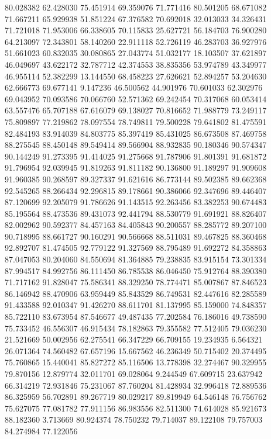 80.028382
62.428030
75.451914
69.359076
71.771416
80.501205
68.671082
71.667211
65.929938
51.851224
67.376582
70.692018
32.013033
34.326431
71.721018
71.953006
66.338605
70.115833
25.627721
56.184703
76.900280
64.213097
72.343801
58.140260
22.911118
52.726119
46.283703
36.927976
51.661023
60.832035
30.080865
27.043774
51.032177
18.103507
37.621897
46.049697
43.622172
32.787712
42.374553
38.835356
53.974789
43.349977
46.955114
52.382299
13.144550
68.458223
27.626621
52.894257
53.204630
62.666773
69.677141
9.147236
46.500562
44.901976
70.601033
62.302976
69.043952
70.093586
70.066760
52.571362
69.242454
70.317068
60.053414
63.557476
65.707188
67.616079
69.138027
70.816652
71.988779
73.249117
75.809897
77.219862
78.097554
78.749811
79.500228
79.641802
81.475591
82.484193
83.914039
84.803775
85.397419
85.431025
86.673508
87.469758
88.275545
88.450148
89.549414
89.566904
88.932835
90.180346
90.574347
90.144249
91.273395
91.414025
91.275668
91.787906
91.801391
91.681872
91.796954
92.039945
91.819263
91.811182
90.136800
91.189297
91.909608
91.960385
90.268597
89.327337
91.621616
86.773144
89.502385
89.662368
92.545265
88.266434
92.296815
89.178661
90.386066
92.347696
89.446407
87.120699
92.205079
91.786626
91.143515
92.263456
83.382253
90.674483
85.195564
88.473536
89.431073
92.441794
88.530779
91.691921
88.826407
82.002962
90.592377
84.457163
84.405843
90.200557
88.285772
89.207100
90.718995
88.661727
90.160291
90.566668
88.511031
89.467825
88.360468
92.892707
81.474505
92.779122
91.327569
88.795489
91.692272
84.358863
87.047053
80.204060
84.550694
81.364885
79.238835
83.915154
73.301334
87.994517
84.992756
86.111450
86.785538
86.046450
75.912764
88.390380
71.717162
91.828047
75.586341
88.329250
78.774471
85.007867
87.846523
86.146942
88.470906
63.959449
85.843529
86.749531
82.447616
82.285589
91.433588
92.010347
91.426270
88.611701
81.137995
85.159000
74.848357
85.722110
83.673954
87.546677
49.487435
77.202584
76.186016
49.738590
75.733452
46.556307
46.915434
78.182863
79.355582
77.512405
79.036230
21.521669
50.002956
62.275541
66.347229
66.709155
19.234935
6.564321
26.071364
74.560482
67.657196
15.667562
46.236349
50.715402
20.374495
75.760865
15.440041
85.827272
85.116506
13.778398
32.274467
90.329955
79.870156
12.879774
32.011701
69.028064
9.244549
67.609715
23.637942
66.314219
72.931846
75.231067
87.760204
81.428934
32.996418
72.889536
86.325959
56.702891
89.267719
80.029217
89.819949
64.546148
76.756762
75.627075
77.081782
77.911156
86.983556
82.511300
74.614028
85.921673
88.182360
3.713669
80.924374
78.750232
79.714037
89.122108
79.757003
84.274984
77.122056
